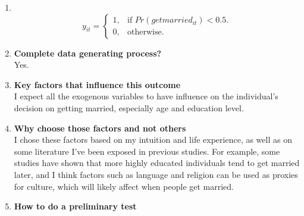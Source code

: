 \documentclass[11pt, oneside]{article}
\begin{document}
\begin{enumerate}
\begin{enumerate} [label=(\alph*)]
\textbf{endogenous:}\\
$Pr(getmarried_{it})$: probability of individual $i$ getting married in year $t$\\
\textbf{exogenous:}\\
$age, education, income, family$: age, year of schooling, income, family environment (lower number for unhappy family and higher score for happy family) of individual $i$ in year $t$, \textit{numerical}.\\
$sex, religion, dating, orientation, political, language$: sex, religion, dating status, sexual orientation, political leaning, and language spoken of individual $i$ in year $t$, \textit{categorical, coded into dummy variables.}\\
\item {}\\
$$
  y_{it}=\begin{cases}
    1, & \text{if $Pr(getmarried_{it}) < 0.5$}.\\
    0, & \text{otherwise}.
  \end{cases}
$$
\item \textbf{Complete data generating process?}\\
Yes. 
\item \textbf{Key factors that influence this outcome}\\
I expect all the exogenous variables to have influence on the individual's decision on getting married, especially age and education level. 
\item \textbf{Why choose those factors and not others}\\
I chose these factors based on my intuition and life experience, as well as on some literature I've been exposed in previous studies. For example, some studies have shown that more highly educated individuals tend to get married later, and I think factors such as language and religion can be used as proxies for culture, which will likely affect when people get married.
\item \textbf{How to do a preliminary test}\\

\end{enumerate}
\end{enumerate}
\end{document}
